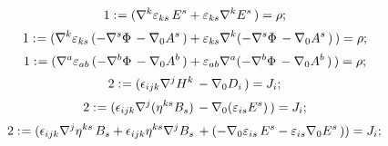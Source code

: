 \documentclass[11pt]{article}
\def\specialcolon{\mathrel{\mathop{:}}\hspace{-.5em}}
\begin{document}
\begin{dmath*}[compact, spread=2pt]
1\specialcolon{}= ({\nabla}^{k}{{\varepsilon}_{k s}}\,  {E}^{s} + {\varepsilon}_{k s} {\nabla}^{k}{{E}^{s}}\, ) = \rho;
\end{dmath*}
\begin{dmath*}[compact, spread=2pt]
1\specialcolon{}= ({\nabla}^{k}{{\varepsilon}_{k s}}\,  ( - {\nabla}^{s}{\Phi}\,  - {\nabla}_{0}{{A}^{s}}\, ) + {\varepsilon}_{k s} {\nabla}^{k}{( - {\nabla}^{s}{\Phi}\,  - {\nabla}_{0}{{A}^{s}}\, )}\, ) = \rho;
\end{dmath*}
\begin{dmath*}[compact, spread=2pt]
1\specialcolon{}= ({\nabla}^{a}{{\varepsilon}_{a b}}\,  ( - {\nabla}^{b}{\Phi}\,  - {\nabla}_{0}{{A}^{b}}\, ) + {\varepsilon}_{a b} {\nabla}^{a}{( - {\nabla}^{b}{\Phi}\,  - {\nabla}_{0}{{A}^{b}}\, )}\, ) = \rho;
\end{dmath*}
\begin{dmath*}[compact, spread=2pt]
2\specialcolon{}= ({\epsilon}_{i j k} {\nabla}^{j}{{H}^{k}}\,  - {\nabla}_{0}{{D}_{i}}\, ) = {J}_{i};
\end{dmath*}
\begin{dmath*}[compact, spread=2pt]
2\specialcolon{}= ({\epsilon}_{i j k} {\nabla}^{j}{({\eta}^{k s} {B}_{s})}\,  - {\nabla}_{0}{({\varepsilon}_{i s} {E}^{s})}\, ) = {J}_{i};
\end{dmath*}
\begin{dmath*}[compact, spread=2pt]
2\specialcolon{}= ({\epsilon}_{i j k} {\nabla}^{j}{{\eta}^{k s}}\,  {B}_{s} + {\epsilon}_{i j k} {\eta}^{k s} {\nabla}^{j}{{B}_{s}}\,  + ( - {\nabla}_{0}{{\varepsilon}_{i s}}\,  {E}^{s} - {\varepsilon}_{i s} {\nabla}_{0}{{E}^{s}}\, )) = {J}_{i};
\end{dmath*}
\end{document}

